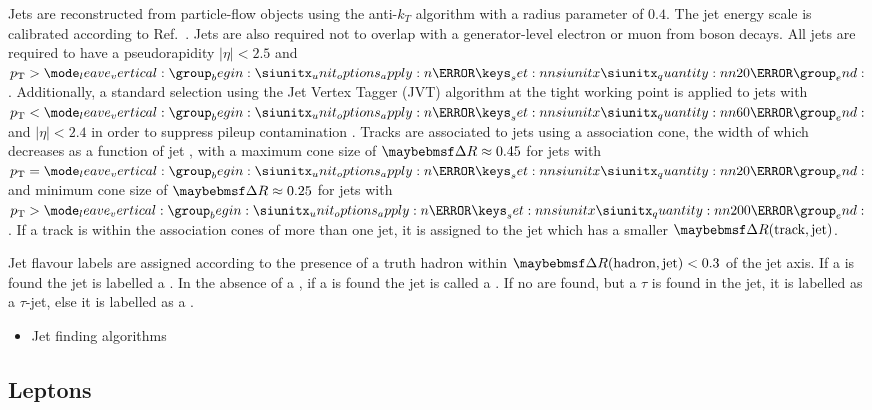 Jets are reconstructed from particle-flow objects \cite{PERF-2015-09} using the anti-$k_T$ algorithm \cite{Cacciari:2008gp} with a radius parameter of $0.4$.
The jet energy scale is calibrated according to Ref.~\cite{PERF-2016-04}.
Jets are also required not to overlap with a generator-level electron or muon from \Wboson boson decays.
All jets are required to have a pseudorapidity $|\eta| < 2.5$ and $\pt > \SI{20}{\GeV}$. 
Additionally, a standard selection using the Jet Vertex Tagger (JVT) algorithm at the tight working point is applied to jets with $\pt < \SI{60}{\GeV}$ and $|\eta| < 2.4$ in order to suppress pileup contamination \cite{ATLAS-CONF-2014-018}.
Tracks are associated to jets using a \DeltaR association cone, the width of which decreases as a function of jet \pt, with a maximum cone size of $\DeltaR \approx 0.45$ for jets with $\pt = \SI{20}{\GeV}$ and minimum cone size of $\DeltaR \approx 0.25$ for jets with $\pt > \SI{200}{\GeV}$. 
If a track is within the association cones of more than one jet, it is assigned to the jet which has a smaller $\DeltaR(\text{track}, \text{jet})$.

Jet flavour labels are assigned according to the presence of a truth hadron within ${\DeltaR(\text{hadron},\text{jet})<0.3}$ of the jet axis. If a \bhadron is found the jet is labelled a \bjet. In the absence of a \bhadron, if a \chadron is found the jet is called a \cjet.
If no \borchadrons are found, but a $\tau$ is found in the jet, it is labelled as a $\tau$-jet, else it is labelled as a \ljet.


\begin{itemize}
  \item Jet finding algorithms
\end{itemize}

\subsection{Leptons}\label{sec:leptons}